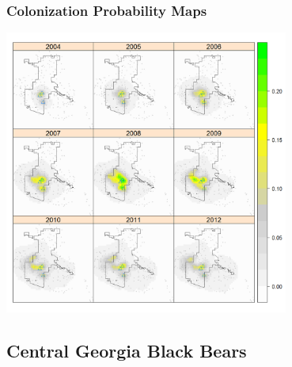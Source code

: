 \documentclass[color=usenames,dvipsnames]{beamer}\usepackage[]{graphicx}\usepackage[]{xcolor}
\begin{document}
\begin{frame}
  \frametitle{Colonization Probability Maps}
  \begin{center}
    \includegraphics[width=0.7\textwidth]{figs/colMap1-9nohill}
  \end{center}
\end{frame}




\subsection{Central Georgia Black Bears}
\end{document}
